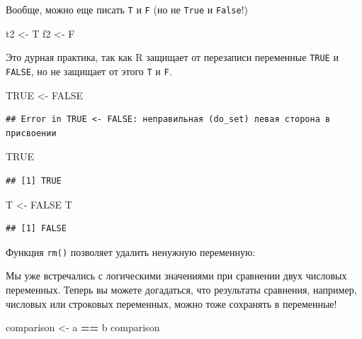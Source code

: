 \documentclass[]{book}
\newenvironment{Shaded}{\begin{snugshade}}{\end{snugshade}}
\newcommand{\StringTok}[1]{\textcolor[rgb]{0.31,0.60,0.02}{#1}}
\newcommand{\OtherTok}[1]{\textcolor[rgb]{0.56,0.35,0.01}{#1}}
\newcommand{\OperatorTok}[1]{\textcolor[rgb]{0.81,0.36,0.00}{\textbf{#1}}}
\newcommand{\NormalTok}[1]{#1}
\begin{document}
Вообще, можно еще писать \texttt{T} и \texttt{F} (но не \texttt{True} и
\texttt{False}!)

\begin{Shaded}
\begin{Highlighting}[]
\NormalTok{t2 <-}\StringTok{ }\NormalTok{T}
\NormalTok{f2 <-}\StringTok{ }\NormalTok{F}
\end{Highlighting}
\end{Shaded}

Это дурная практика, так как R защищает от перезаписи переменные
\texttt{TRUE} и \texttt{FALSE}, но не защищает от этого \texttt{T} и
\texttt{F}.

\begin{Shaded}
\begin{Highlighting}[]
\OtherTok{TRUE}\NormalTok{ <-}\StringTok{ }\OtherTok{FALSE}
\end{Highlighting}
\end{Shaded}

\begin{verbatim}
## Error in TRUE <- FALSE: неправильная (do_set) левая сторона в присвоении
\end{verbatim}

\begin{Shaded}
\begin{Highlighting}[]
\OtherTok{TRUE}
\end{Highlighting}
\end{Shaded}

\begin{verbatim}
## [1] TRUE
\end{verbatim}

\begin{Shaded}
\begin{Highlighting}[]
\NormalTok{T <-}\StringTok{ }\OtherTok{FALSE}
\NormalTok{T}
\end{Highlighting}
\end{Shaded}

\begin{verbatim}
## [1] FALSE
\end{verbatim}

Функция \texttt{rm()} позволяет удалить ненужную переменную:

Мы уже встречались с логическими значениями при сравнении двух числовых
переменных. Теперь вы можете догадаться, что результаты сравнения,
например, числовых или строковых переменных, можно тоже сохранять в
переменные!

\begin{Shaded}
\begin{Highlighting}[]
\NormalTok{comparison <-}\StringTok{ }\NormalTok{a }\OperatorTok{==}\StringTok{ }\NormalTok{b}
\NormalTok{comparison}
\end{Highlighting}
\end{Shaded}
\end{document}
